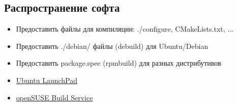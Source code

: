 \subsection{Распространение софта}

\begin{itemize}
	\item Предоставить файлы для компиляции: ./configure, CMakeLists.txt, ...
	\item Предоставить ./debian/ файлы (debuild) для Ubuntu/Debian
	\item Предоставить package.spec (rpmbuild) для разных дистрибутивов
	\item \href{https://launchpad.net}{Ubuntu LaunchPad}
	\item \href{https://build.opensuse.org}{openSUSE Build Service}
\end{itemize}

